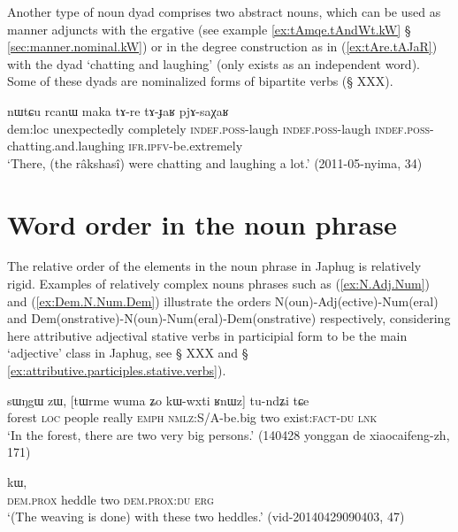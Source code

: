 Another type of noun dyad comprises two abstract nouns, which can be used as manner adjuncts with the ergative (see example \ref{ex:tAmqe.tAndWt.kW} § \ref{sec:manner.nominal.kW}) or in the degree construction as in (\ref{ex:tAre.tAJaR}) with the dyad  `chatting and laughing' (only  exists as an independent word). Some of these dyads are nominalized forms of bipartite verbs (§ XXX).

\begin{exe}
\ex \label{ex:tAre.tAJaR}
 \gll  nɯtɕu rcanɯ maka tɤ-re tɤ-ɟaʁ pjɤ-saχaʁ \\
 dem:loc unexpectedly completely \textsc{indef}.\textsc{poss}-laugh \textsc{indef}.\textsc{poss}-laugh \textsc{indef}.\textsc{poss}-chatting.and.laughing \textsc{ifr}.\textsc{ipfv}-be.extremely \\
 \glt `There, (the râkshasî) were chatting and laughing a lot.' (2011-05-nyima, 34)
\end{exe}

\section{Word order in the noun phrase}
The relative order of the elements in the noun phrase in Japhug is relatively rigid.  Examples of relatively complex nouns phrases such as (\ref{ex:N.Adj.Num}) and (\ref{ex:Dem.N.Num.Dem}) illustrate the orders N(oun)-Adj(ective)-Num(eral) and Dem(onstrative)-N(oun)-Num(eral)-Dem(onstrative) respectively, considering here attributive adjectival stative verbs in participial form to be the main `adjective' class in Japhug, see § XXX and § \ref{ex:attributive.participles.stative.verbs}).
 
\begin{exe}
\ex \label{ex:N.Adj.Num}
 \gll sɯŋgɯ zɯ, [tɯrme wuma ʑo kɯ-wxti ʁnɯz] tu-ndʑi tɕe \\
 forest \textsc{loc} people really \textsc{emph} \textsc{nmlz}:S/A-be.big two exist:\textsc{fact}-\textsc{du} \textsc{lnk} \\
 \glt `In the forest, there are two very big persons.' (140428 yonggan de xiaocaifeng-zh, 171)
\end{exe}

\begin{exe}
\ex \label{ex:Dem.N.Num.Dem}
  kɯ, \\
 \textsc{dem}.\textsc{prox} heddle two \textsc{dem}.\textsc{prox}:\textsc{du} \textsc{erg} \\
 \glt `(The weaving is done) with these two heddles.' (vid-20140429090403, 47)
\end{exe}

